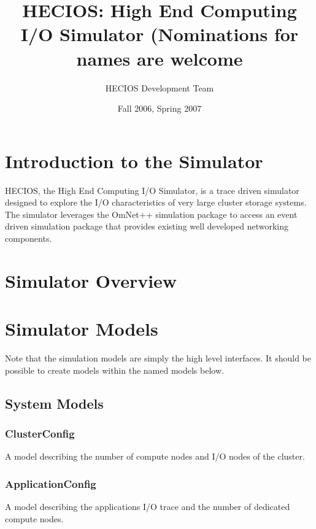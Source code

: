 \documentclass[11pt]{article}
\title{HECIOS: High End Computing I/O Simulator (Nominations for names are welcome}
\author{HECIOS Development Team}
\date{Fall 2006, Spring 2007}
\begin{document}
\maketitle

\newpage

\setcounter{tocdepth}{2}
\tableofcontents

%
%
\setlength{\parindent}{0pt}
\setlength{\parskip}{11pt}

%
%
\section{Introduction to the Simulator}
HECIOS, the High End Computing I/O Simulator, is a trace driven simulator
designed to explore the I/O characteristics of very large cluster storage
systems.  The simulator leverages the OmNet++ simulation package to access an
event driven simulation package that provides existing well developed
networking components.

\section{Simulator Overview}

\section{Simulator Models}
Note that the simulation models are simply the high level interfaces.  It
should be possible to create models within the named models below.

\subsection{System Models}

\subsubsection{ClusterConfig}
A model describing the number of compute nodes and I/O nodes of the cluster.

\subsubsection{ApplicationConfig}
A model describing the applications I/O trace and the number of dedicated
compute nodes.
\end{document}
